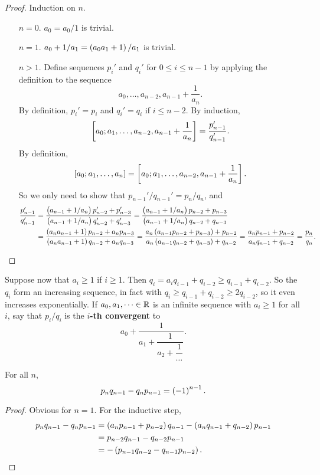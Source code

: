 \begin{proof}
Induction on $ n $.
\begin{itemize}[leftmargin=0.5in]
\item[$ n = 0 $.] $ a_0 = a_0 / 1 $ is trivial.
\item[$ n = 1 $.] $ a_0 + 1 / a_1 = \br{a_0a_1 + 1} / a_1 $ is trivial.
\item[$ n > 1 $.] Define sequences $ p_i' $ and $ q_i' $ for $ 0 \le i \le n - 1 $ by applying the definition to the sequence
$$ a_0, \dots, a_{n - 2}, a_{n - 1} + \dfrac{1}{a_n}. $$
By definition, $ p_i' = p_i $ and $ q_i' = q_i $ if $ i \le n - 2 $. By induction,
$$ \sbr{a_0; a_1, \dots, a_{n - 2}, a_{n - 1} + \dfrac{1}{a_n}} = \dfrac{p_{n - 1}'}{q_{n - 1}'}. $$
By definition,
$$ \sbr{a_0; a_1, \dots, a_n} = \sbr{a_0; a_1, \dots, a_{n - 2}, a_{n - 1} + \dfrac{1}{a_n}}. $$
So we only need to show that $ p_{n - 1}' / q_{n - 1}' = p_n / q_n $, and
\begin{align*}
\dfrac{p_{n - 1}'}{q_{n - 1}'}
& = \dfrac{\br{a_{n - 1} + 1 / a_n}p_{n - 2}' + p_{n - 3}'}{\br{a_{n - 1} + 1 / a_n}q_{n - 2}' + q_{n - 3}'}
= \dfrac{\br{a_{n - 1} + 1 / a_n}p_{n - 2} + p_{n - 3}}{\br{a_{n - 1} + 1 / a_n}q_{n - 2} + q_{n - 3}} \\
& = \dfrac{\br{a_na_{n - 1} + 1}p_{n - 2} + a_np_{n - 3}}{\br{a_na_{n - 1} + 1}q_{n - 2} + a_nq_{n - 3}}
= \dfrac{a_n\br{a_{n - 1}p_{n - 2} + p_{n - 3}} + p_{n - 2}}{a_n\br{a_{n - 1}q_{n - 2} + q_{n - 3}} + q_{n - 2}}
= \dfrac{a_np_{n - 1} + p_{n - 2}}{a_nq_{n - 1} + q_{n - 2}}
= \dfrac{p_n}{q_n}.
\end{align*}
\end{itemize}
\end{proof}

Suppose now that $ a_i \ge 1 $ if $ i \ge 1 $. Then $ q_i = a_iq_{i - 1} + q_{i - 2} \ge q_{i - 1} + q_{i - 2} $. So the $ q_i $ form an increasing sequence, in fact with $ q_i \ge q_{i - 1} + q_{i - 2} \ge 2q_{i - 2} $, so it even increases exponentially. If $ a_0, a_1, \dots \in \mathbb{R} $ is an infinite sequence with $ a_i \ge 1 $ for all $ i $, say that $ p_i / q_i $ is the \textbf{$ i $-th convergent} to
$$ a_0 + \dfrac{1}{a_1 + \dfrac{1}{a_2 + \dfrac{1}{\dots}}}. $$

\begin{lemma}
\label{lem:69}
For all $ n $,
$$ p_nq_{n - 1} - q_np_{n - 1} = \br{-1}^{n - 1}. $$
\end{lemma}

\begin{proof}
Obvious for $ n = 1 $. For the inductive step,
\begin{align*}
p_nq_{n - 1} - q_np_{n - 1}
& = \br{a_np_{n - 1} + p_{n - 2}}q_{n - 1} - \br{a_nq_{n - 1} + q_{n - 2}}p_{n - 1} \\
& = p_{n - 2}q_{n - 1} - q_{n - 2}p_{n - 1} \\
& = -\br{p_{n - 1}q_{n - 2} - q_{n - 1}p_{n - 2}}.
\end{align*}
\end{proof}

